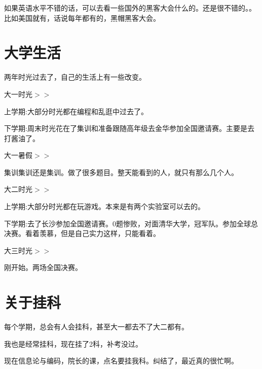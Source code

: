 \documentclass[12pt,a4paper]{article}
\begin{document}
\begin{CJK}{UTF8}{gbsn}
如果英语水平不错的话，可以去看一些国外的黑客大会什么的。还是很不错的。。比如美国就有，话说每年都有的，黑帽黑客大会。

\section{大学生活}
两年时光过去了，自己的生活上有一些改变。

大一时光$>>$

上学期:大部分时光都在编程和乱逛中过去了。

下学期:周末时光花在了集训和准备跟随高年级去金华参加全国邀请赛。主要是去打酱油了。

大一暑假$>>$

集训集训还是集训。做了很多题目。整天能看到的人，就只有那么几个人。

大二时光$>>$

上学期:大部分时光都在玩游戏。本来是有两个实验室可以去的。

下学期:去了长沙参加全国邀请赛。0题惨败，对面清华大学，冠军队。参加全球总决赛。看着羡慕，但是自己实力这样，只能看着。

大三时光$>>$

刚开始。两场全国决赛。

\section{关于挂科}
每个学期，总会有人会挂科，甚至大一都去不了大二都有。

我也是经常挂科，现在挂了2科，补考没过。

现在信息论与编码，院长的课，点名要挂我科。纠结了，最近真的很忙啊。


\end{CJK}
\end{document}
